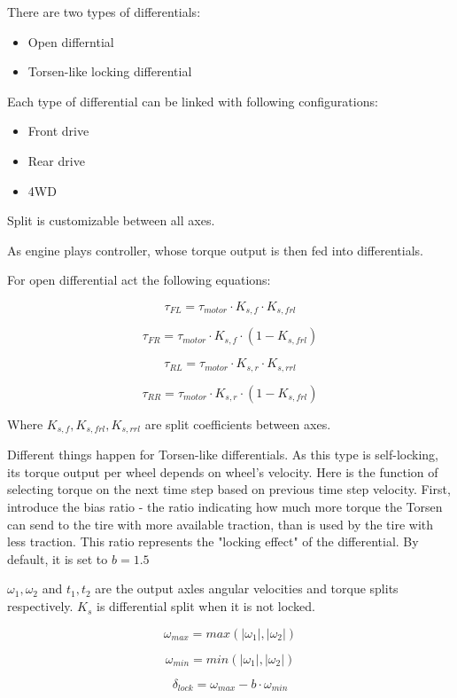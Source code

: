 \documentclass[a4paper,11pt]{article}
\begin{document}
There are two types of differentials:
\begin{itemize}
	\item Open differntial
	\item Torsen-like locking differential \cite{torsen-whitepaper}
\end{itemize}

Each type of differential can be linked with following configurations: 
\begin{itemize}
	\item Front drive
	\item Rear drive
	\item 4WD
\end{itemize}

Split is customizable between all axes.

As engine plays controller, whose torque output is then fed into differentials. 

For open differential act the following equations:

$$
\tau_{FL} = \tau_{motor} \cdot K_{s,f} \cdot K_{s,frl}
$$

$$
\tau_{FR} = \tau_{motor} \cdot K_{s,f} \cdot (1 - K_{s,frl})
$$

$$
\tau_{RL} = \tau_{motor} \cdot K_{s,r} \cdot K_{s,rrl}
$$

$$
\tau_{RR} = \tau_{motor} \cdot K_{s,r} \cdot (1 - K_{s,frl})
$$


Where $K_{s,f}, K_{s,frl}, K_{s,rrl}$ are split coefficients between axes.

Different things happen for Torsen-like differentials. 
As this type is self-locking, its torque output per wheel depends on wheel's velocity. Here is the function of selecting torque on the next time step based on previous time step velocity. First, introduce the bias ratio - the ratio indicating how much more torque the Torsen can send to the tire with more available traction, than is used by the tire with less traction. This ratio represents the "locking effect" of the differential. By default, it is set to $b = 1.5$

$\omega_1, \omega_2$ and $t_1, t_2$ are the output axles angular velocities and torque splits respectively. $K_s$ is differential split when it is not locked.

$$
\omega_{max} = max(|\omega_1|, |\omega_2|)
$$

$$
\omega_{min} = min(|\omega_1|, |\omega_2|)
$$

$$
\delta_{lock} = \omega_{max} - b \cdot \omega_{min}
$$
\end{document}
